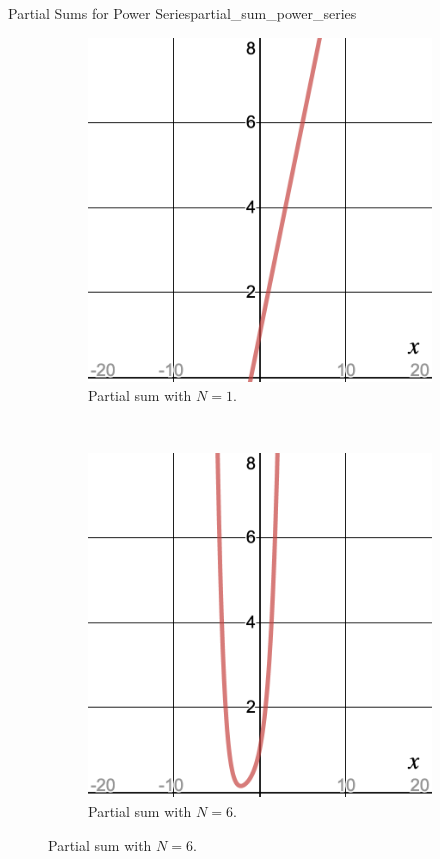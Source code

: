 \begin{ex}{Partial Sums for Power Series}{partial_sum_power_series}
\begin{figure}[H]
\begin{subfigure}[h]{.3\textwidth}
        \includegraphics[width=\textwidth]{Figures_Part_3/ex_powseries_N=1.png}
        \caption{Partial sum with $N=1$.}
    \end{subfigure}
    ~
    \begin{subfigure}[h]{.3\textwidth}
        \includegraphics[width=\textwidth]{Figures_Part_3/ex_powseries_N=6.png}
        \caption{Partial sum with $N=6$.}
    \end{subfigure}
\end{figure}
\end{ex}

